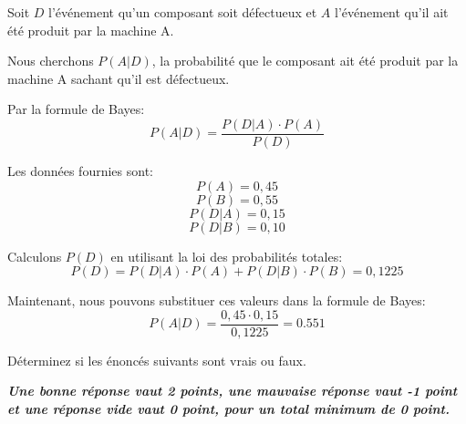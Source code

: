 \begin{questions}
\begin{solution}
Soit \( D \) l'événement qu'un composant soit défectueux et \( A \) l'événement qu'il ait été produit par la machine A.

Nous cherchons \( P(A|D) \), la probabilité que le composant ait été produit par la machine A sachant qu'il est défectueux.

Par la formule de Bayes:
\[ P(A|D) = \frac{P(D|A) \cdot P(A)}{P(D)} \]

Les données fournies sont:
\[ P(A) = 0,45 \]
\[ P(B) = 0,55 \]
\[ P(D|A) = 0,15 \]
\[ P(D|B) = 0,10 \]

Calculons \( P(D) \) en utilisant la loi des probabilités totales:
\[ P(D) = P(D|A) \cdot P(A) + P(D|B) \cdot P(B) = 0,1225 \]

Maintenant, nous pouvons substituer ces valeurs dans la formule de Bayes:
\[ P(A|D) = \frac{0,45 \cdot 0,15}{0,1225} = 0.551 \]
\end{solution}

\vfill

\question[10]
Déterminez si les énoncés suivants sont vrais ou faux. 

\textbf{\textit{Une bonne réponse vaut 2 points, une mauvaise réponse vaut -1 point et une réponse vide vaut 0 point, pour un total minimum de 0 point.}}

\end{questions}
